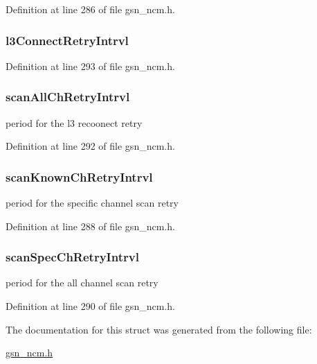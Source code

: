 Definition at line 286 of file gsn\_\-ncm.h.

\hypertarget{a00162_aa22a68fbe07fab38ee60393088fa8e51}{
\subsubsection[{l3ConnectRetryIntrvl}]{ {\bf l3ConnectRetryIntrvl}}}
\label{a00162_aa22a68fbe07fab38ee60393088fa8e51}


Definition at line 293 of file gsn\_\-ncm.h.

\hypertarget{a00162_a5ac879a69bca256a0e5546d077e44815}{
\subsubsection[{scanAllChRetryIntrvl}]{ {\bf scanAllChRetryIntrvl}}}
\label{a00162_a5ac879a69bca256a0e5546d077e44815}
period for the l3 recoonect retry 

Definition at line 292 of file gsn\_\-ncm.h.

\hypertarget{a00162_ad1fac77c1f2a1c73296078ef959d5dfc}{
\subsubsection[{scanKnownChRetryIntrvl}]{ {\bf scanKnownChRetryIntrvl}}}
\label{a00162_ad1fac77c1f2a1c73296078ef959d5dfc}
period for the specific channel scan retry 

Definition at line 288 of file gsn\_\-ncm.h.

\hypertarget{a00162_ad9287c67ea0af98a129fb29730c68610}{
\subsubsection[{scanSpecChRetryIntrvl}]{ {\bf scanSpecChRetryIntrvl}}}
\label{a00162_ad9287c67ea0af98a129fb29730c68610}
period for the all channel scan retry 

Definition at line 290 of file gsn\_\-ncm.h.



The documentation for this struct was generated from the following file:\begin{DoxyCompactItemize}
\item 
\hyperlink{a00529}{gsn\_\-ncm.h}\end{DoxyCompactItemize}
